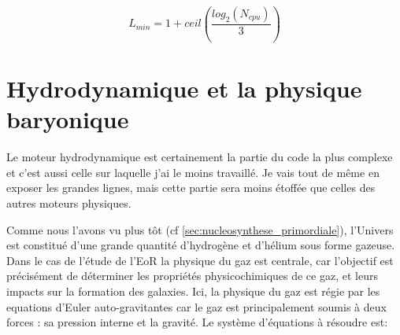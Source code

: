 \begin{equation}
L_{min} = 1 + ceil \left(\frac{log_2(N_{cpu})}{3}  \right) 
\end{equation}


%
%


%




\clearpage
\section{Hydrodynamique et la physique baryonique}
\label{sec:hydro}

Le moteur hydrodynamique est certainement la partie du code la plus complexe et c'est aussi celle sur laquelle j'ai le moins travaillé.
Je vais tout de même en exposer les grandes lignes, mais cette partie sera moins étoffée que celles des autres moteurs physiques.

Comme nous l'avons vu plus tôt (cf \ref{sec:nucleosynthese_primordiale}), l'Univers est constitué d'une grande quantité d'hydrogène et d'hélium sous forme gazeuse.
Dans le cas de l'étude de l'\ac{EoR} la physique du gaz est centrale, car l'objectif est précisément de déterminer les propriétés physicochimiques de ce gaz, et leurs impacts sur la formation des galaxies.
Ici, la physique du gaz est régie par les equations d'Euler auto-gravitantes car le gaz est principalement soumis à deux forces : sa pression interne et la gravité.
Le système d'équations à résoudre est:

